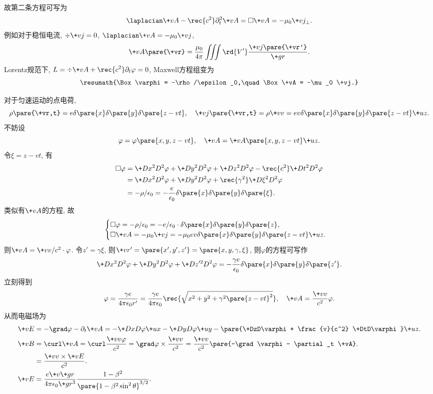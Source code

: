 \documentclass[hidelinks]{ctexart}
\begin{document}
故第二条方程可写为
\[ \laplacian \+vA - \rec{c^2}\partial_t^2 \+vA = \Box \+vA = -\mu_0 \+vj_\perp. \]
例如对于稳恒电流, $\div \+vj = 0$, $\laplacian \+vA = -\mu_0 \+vj$,
\[ \+vA\pare{\+vr} = \frac{\mu_0}{4\pi} \iiint\rd{V'} \frac{\+vj\pare{\+vr'}}{\+gr}. \]
Lorentz规范下, $\displaystyle L = \div \+vA + \rec{c^2}\partial_t \varphi = 0$, Maxwell方程组变为
\[ \resumath{\Box \varphi = -\rho/\epsilon_0,\quad \Box \+vA = -\mu_0 \+vj.} \]
\begin{figure}[ht]
    \centering
\end{figure}
\begin{ex}
    对于匀速运动的点电荷,
    \[ \rho\pare{\+vr,t} = e\delta\pare{x}\delta\pare{y}\delta\pare{z-vt},\quad \+vj\pare{\+vr,t} = \rho \+vv = ev\delta\pare{x}\delta\pare{y}\delta\pare{z-vt}\+uz. \]
    不妨设
    \[ \varphi = \varphi\pare{x,y,z-vt},\quad \+vA = \+vA\pare{x,y,z-vt}\+uz. \]
    令$\xi = z-vt$, 有
    \begin{align*}
        \Box \varphi &= \+D{x^2}D{^2\varphi} + \+D{y^2}D{^2\varphi} + \+D{z^2}D{^2\varphi} - \rec{c^2}\+D{t^2}D{^2\varphi} \\
        &= \+D{x^2}D{^2\varphi} + \+D{y^2}D{^2\varphi} + \rec{\gamma^2} \+D{\xi^2}D{^2\varphi}\\
        &= -\rho/\epsilon_0 = -\frac{e}{\epsilon_0} \delta\pare{x}\delta\pare{y}\delta\pare{\xi}.
    \end{align*}
    类似有$\+vA$的方程, 故
    \[ \begin{cases}
        \Box \varphi = -\rho/\epsilon_0 = -e/\epsilon_0 \cdot \delta\pare{x}\delta\pare{y}\delta\pare{z}, \\
        \Box \+vA = -\mu_0 \+vj = -\mu_0 ev \delta\pare{x}\delta\pare{y}\delta\pare{z-vt}\+uz.
    \end{cases} \]
    则$\+vA = \+vv/c^2\cdot \varphi$. 令$z' = \gamma \xi$, 则$\+vr' = \pare{x',y',z'} = \pare{x,y,\gamma,\xi}$, 则$\varphi$的方程可写作
    \begin{align*}
        \+D{x^2}D{^2\varphi} + \+D{y^2}D{^2\varphi} + \+D{z'^2}D{^2\varphi} = -\frac{\gamma e}{\epsilon_0} \delta\pare{x}\delta\pare{y}\delta\pare{z'}.
    \end{align*}
    立刻得到
    \[ \varphi = \frac{\gamma e}{4\pi\epsilon_0 r'} = \frac{\gamma e}{4\pi\epsilon_0} \rec{\sqrt{x^2+y^2+\gamma^2\pare{z-vt}^2}},\quad \+vA = \frac{\+vv}{c^2}\varphi. \]
    从而电磁场为
    \begin{align*}
        \+vE &= -\grad \varphi - \partial_t \+vA = -\+DxD{\varphi}\+ux - \+DyD{\varphi} \+uy - \pare{\+DzD\varphi + \frac{v}{c^2} \+DtD\varphi} \+uz. \\
        \+vB &= \curl \+vA = \curl \frac{\+vv\varphi}{c^2} = \grad \varphi \times \frac{\+vv}{c^2} = \frac{\+vv}{c^2}\pare{-\grad \varphi - \partial_t \+vA}.\\
        &= \frac{\+vv\times \+vE}{c^2}.\\
        \+vE &= \frac{e\+v{\+gr}}{4\pi\epsilon_0 \+gr^3} \frac{1-\beta^2}{\pare{1-\beta^2\sin^2\theta}^{3/2}}.
    \end{align*}
\end{ex}
\end{document}
